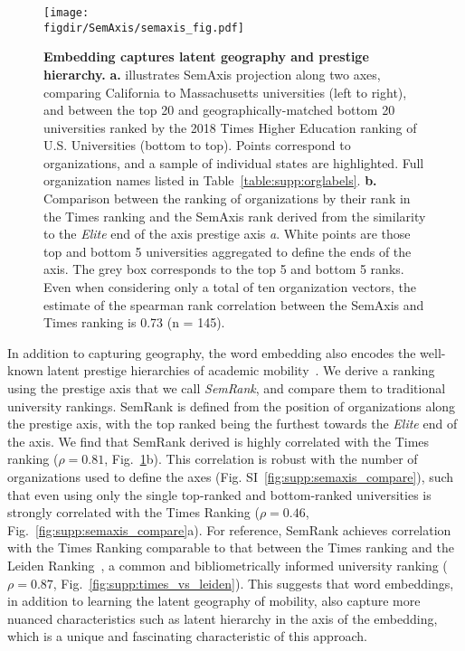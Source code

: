 \documentclass[12pt]{article} %
\def\figdir{../Figs}
\begin{document}
%
%
\begin{figure}[hp!]
	\centering
	\texttt{[image: \\figdir/SemAxis/semaxis\_fig.pdf]}
	\caption{
		\textbf{Embedding captures latent geography and prestige hierarchy.}
		\textbf{a.} illustrates SemAxis projection along two axes, comparing California to Massachusetts universities (left to right), and between the top 20 and geographically-matched bottom 20 universities ranked by the 2018 Times Higher Education ranking of U.S. Universities (bottom to top).
		Points correspond to organizations, and a sample of individual states are highlighted.
		Full organization names listed in Table~\ref{table:supp:orglabels}.
		\textbf{b.} Comparison between the ranking of organizations by their rank in the Times ranking and the SemAxis rank derived from the similarity to the \textit{Elite} end of the axis prestige axis \textit{a}.
		White points are those top and bottom 5 universities aggregated to define the ends of the axis.
		The grey box corresponds to the top 5 and bottom 5 ranks.
	  		  	Even when considering only a total of ten organization vectors, the estimate of the spearman rank correlation between the SemAxis and Times ranking is 0.73 (n = 145).
	}
	\label{fig:semaxis}
\end{figure}

In addition to capturing geography, the word embedding also encodes the well-known latent prestige hierarchies of academic mobility~\autocite{deville2014career, clauset2015hierarchy}.
We derive a ranking using the prestige axis that we call \textit{SemRank}, and compare them to traditional university rankings.
SemRank is defined from the position of organizations along the prestige axis, with the top ranked being the furthest towards the \textit{Elite} end of the axis.
We find that SemRank derived is highly correlated with the Times ranking ($\rho = 0.81$, Fig.~\ref{fig:semaxis}b).
This correlation is robust with the number of organizations used to define the axes (Fig. SI~\ref{fig:supp:semaxis_compare}), such that even using only the single top-ranked and bottom-ranked universities is strongly correlated with the Times Ranking ($\rho = 0.46$, Fig.~\ref{fig:supp:semaxis_compare}a).
For reference, SemRank achieves correlation with the Times Ranking comparable to that between the Times ranking and the Leiden Ranking~\autocite{waltman2012leidenrankings}, a common and bibliometrically informed university ranking ($\rho = 0.87$, Fig.~\ref{fig:supp:times_vs_leiden}).
This suggests that word embeddings, in addition to learning the latent geography of mobility, also capture more nuanced characteristics such as latent hierarchy in the axis of the embedding, which is a unique and fascinating characteristic of this approach.
\end{document}
